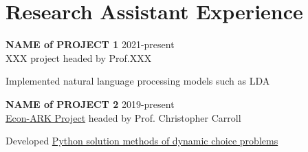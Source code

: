 
\section{Research Assistant Experience} %
\label{sec:research_exper}
\vspace{-0.25in}
\begin{outerlist}
		\item {\bf NAME of PROJECT 1}  \hfill 2021-present\\
	XXX project headed by Prof.XXX
	\begin{innerlist}
		\item Implemented natural language processing models such as LDA
	
	\end{innerlist}
	\item {\bf NAME of PROJECT 2} \hfill 2019-present\\
	\href{https://econ-ark.org}{Econ-ARK Project} headed by Prof. Christopher Carroll
	\begin{innerlist}
		\item Developed \href{https://github.com/llorracc/SolvingMicroDSOPs/blob/master/Code/Python/SolvingMicroDSOP-Python.ipynb}{Python solution methods of dynamic choice problems}
		
	\end{innerlist}
	
\end{outerlist}